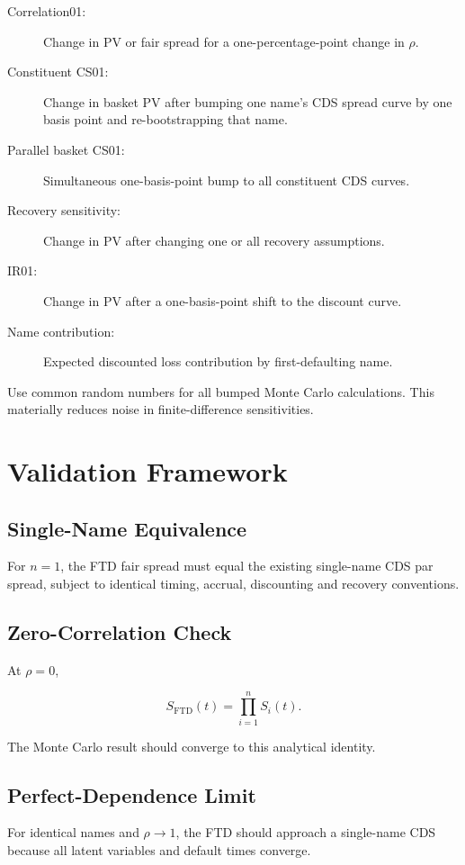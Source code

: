 \documentclass[11pt,a4paper]{article}
\newcommand{\FTD}{\mathrm{FTD}}
\begin{document}
\begin{description}
    \item[Correlation01:] Change in PV or fair spread for a one-percentage-point change in $\rho$.
    \item[Constituent CS01:] Change in basket PV after bumping one name's CDS spread curve by one basis point and re-bootstrapping that name.
    \item[Parallel basket CS01:] Simultaneous one-basis-point bump to all constituent CDS curves.
    \item[Recovery sensitivity:] Change in PV after changing one or all recovery assumptions.
    \item[IR01:] Change in PV after a one-basis-point shift to the discount curve.
    \item[Name contribution:] Expected discounted loss contribution by first-defaulting name.
\end{description}

Use common random numbers for all bumped Monte Carlo calculations. This materially reduces noise in finite-difference sensitivities.

\section{Validation Framework}

\subsection{Single-Name Equivalence}

For $n=1$, the FTD fair spread must equal the existing single-name CDS par spread, subject to identical timing, accrual, discounting and recovery conventions.

\subsection{Zero-Correlation Check}

At $\rho=0$,

\[
S_{\FTD}(t)
=
\prod_{i=1}^{n}S_i(t).
\]

The Monte Carlo result should converge to this analytical identity.

\subsection{Perfect-Dependence Limit}

For identical names and $\rho\rightarrow1$, the FTD should approach a single-name CDS because all latent variables and default times converge.
\end{document}
